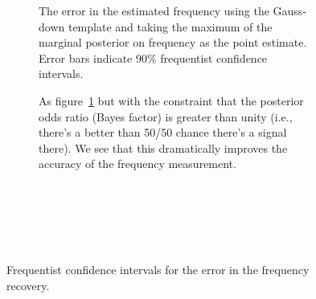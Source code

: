 \documentclass[showpacs, superscriptaddress, showpacs, letterpaper, showkeys,
preprintnumbers, altaffilletter, amssymb, amsmath, amsfonts, prd,
onecolumn, floatfix, nofootinbib]{revtex4-1}
\begin{document}
\begin{figure}
\begin{subfigure}{0.45\textwidth}
{}
\caption{The error in the estimated frequency using the Gauss-down template and
taking the maximum of the marginal posterior on frequency as the point estimate.
Error bars indicate 90\% frequentist confidence intervals. \label{fig:freqerr}}
\end{subfigure}
\begin{subfigure}{0.45\textwidth}
{}
\caption{As figure~\ref{fig:freqerr} but with the constraint that the posterior
odds ratio (Bayes factor) is greater than unity (i.e., there's a better than
50/50 chance there's a signal there).  We see that this dramatically improves
the accuracy of the frequency measurement.~\\~\\~\\~\\~\\~\\}
\end{subfigure}
\caption{Frequentist confidence intervals for the error in the frequency
recovery.\label{fig:freqrecovery}}
\end{figure}
\end{document}
